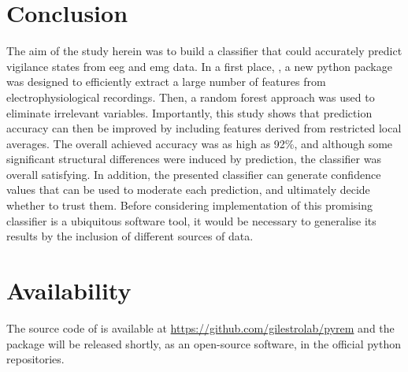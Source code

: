 \section*{Conclusion}

The aim of the study herein was to build a classifier that could accurately predict vigilance states from \gls{eeg} and \gls{emg} data.
In a first place, \pr{}, a new python package was designed to efficiently extract a large number of features from electrophysiological recordings.
Then, a random forest approach was used to eliminate irrelevant variables.
Importantly, this study shows that prediction accuracy can then be improved by including features derived from restricted local averages.
The overall achieved accuracy was as high as 92\%, and although some significant structural differences were induced by prediction,
the classifier was overall satisfying.
In addition, the presented classifier can generate confidence values that can be used to moderate each prediction, and ultimately decide whether to trust them.
Before considering implementation of this promising classifier is a ubiquitous software tool,
it would be necessary to generalise its results by the inclusion of different sources of data.

\section*{Availability}
The source code of \pr{} is available at \href{https://github.com/gilestrolab/pyrem}{https://github.com/gilestrolab/pyrem}
and the package will be released shortly, as an open-source software, in the official python repositories.




